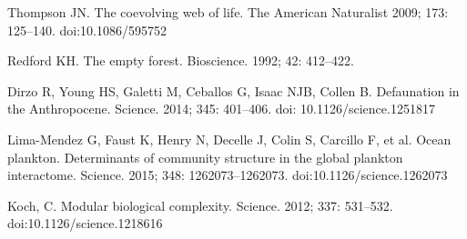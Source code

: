 \documentclass[10pt,letterpaper]{article}
\begin{document}
\nolinenumbers

\begin{thebibliography}{10}
Thompson JN. The coevolving web of life. The American Naturalist 2009; 173: 125–140. doi:10.1086/595752

Redford KH. The empty forest. Bioscience. 1992; 42: 412–422. 

Dirzo R, Young HS, Galetti M, Ceballos G, Isaac NJB, Collen B. Defaunation in the Anthropocene. Science. 2014; 345: 401–406. doi: 10.1126/science.1251817

Lima-Mendez G, Faust K, Henry N, Decelle J, Colin S, Carcillo F, et al. Ocean plankton. Determinants of community structure in the global plankton interactome. Science. 2015; 348: 1262073–1262073. doi:10.1126/science.1262073

Koch, C. Modular biological complexity. Science. 2012; 337: 531–532. doi:10.1126/science.1218616

\end{thebibliography}
\end{document}
